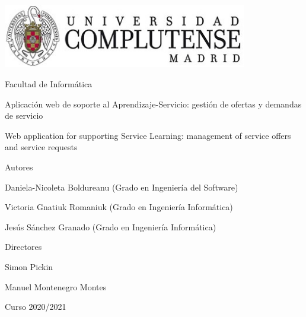 \documentclass[11pt]{book}
\begin{document}
	\begin{titlepage}
		\centering
		{\includegraphics[width=0.8\textwidth]{logo}\par}
		\vspace{1cm}
		{\Large Facultad de Informática \par}
		\vspace{1cm}
		{\Huge Aplicación web de soporte al Aprendizaje-Servicio: gestión de ofertas y demandas de servicio\par}
		\vspace{1cm}
		{\Huge Web application for supporting Service Learning: management of service offers and service requests \par}
		\vspace{2cm}
		{\textbf\Large Autores \par}
		{\Large Daniela-Nicoleta Boldureanu (Grado en Ingeniería del Software)\par}
		{\Large Victoria Gnatiuk Romaniuk (Grado en Ingeniería Informática)\par}
		{\Large Jesús Sánchez Granado (Grado en Ingeniería Informática)\par}
		\vspace{1cm}
		{\textbf\Large Directores \par}
		{\Large Simon Pickin \par}
		{\Large Manuel Montenegro Montes \par}
		\vspace{2cm}
		{\Large Curso 2020/2021 \par}
	\end{titlepage}
	
	\tableofcontents
	\newpage
	\listoffigures
\end{document}
